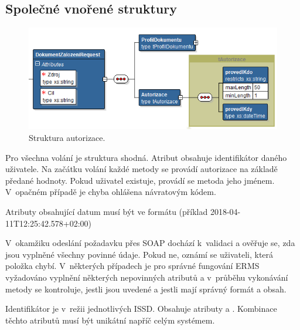 \documentclass[
  master,
  field=ainfp,
  biblatex,
  language=czech,
  glossaries,
  theorems=false,
  index
]{kidiplom}
\begin{document}
\subsection{Společné vnořené struktury}
\begin{figure}[h]
  \centerline{\includegraphics[width=0.9\linewidth]{./images/Autorizace.png}} 
  \caption{Struktura autorizace.} 
\end{figure}
Pro všechna volání je struktura  shodná. Atribut  obsahuje identifikátor daného uživatele. Na začátku volání každé metody se provádí autorizace na základě předané hodnoty. Pokud uživatel existuje, provádí se metoda jeho jménem. V~opačném případě je chyba ohlášena návratovým kódem.

Atributy obsahující datum musí být ve formátu  (příklad 2018-04-11T12:25:42.578+02:00)

V~okamžiku odeslání požadavku přes SOAP dochází k~validaci a ověřuje se, zda jsou vyplněné všechny povinné údaje. Pokud ne, oznámí se uživateli, která položka chybí. V~některých případech je pro správné fungování ERMS vyžadováno vyplnění některých nepovinných atributů a v~průběhu vykonávání metody se kontroluje, jestli jsou uvedené a jestli mají správný formát a obsah.

Identifikátor je v~režii jednotlivých ISSD. Obsahuje atributy  a . Kombinace těchto atributů musí být unikátní napříč celým systémem.
\end{document}
